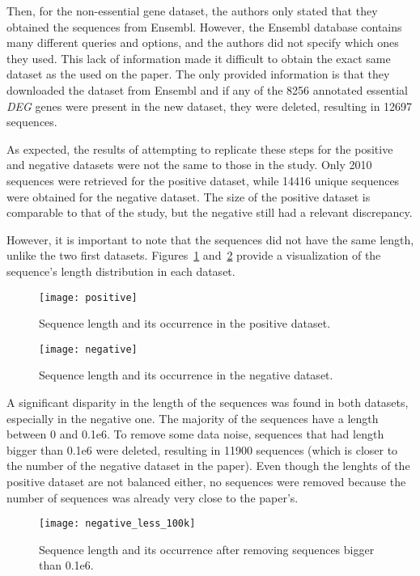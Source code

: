 Then, for the non-essential gene dataset, the authors only stated that they obtained the sequences from Ensembl. However, the Ensembl database contains many different queries and options, and the authors did not specify which ones they used. This lack of information made it difficult to obtain the exact same dataset as the used on the paper. The only provided information is that they downloaded the dataset from Ensembl and if any of the 8256 annotated essential \textit{DEG} genes were present in the new dataset, they were deleted, resulting in 12697 sequences.

As expected, the results of attempting to replicate these steps for the positive and negative datasets were not the same to those in the study. Only 2010 sequences were retrieved for the positive dataset, while 14416 unique sequences were obtained for the negative dataset. The size of the positive dataset is comparable to that of the study, but the negative still had a relevant discrepancy. 

However, it is important to note that the sequences did not have the same length, unlike the two first datasets. Figures~\ref{fig:deg_length} and~\ref{fig:negative}  provide a visualization of the sequence's length distribution in each dataset.

\begin{figure}[htbp]
    \centering
    \texttt{[image: positive]}
    \caption{Sequence length and its occurrence in the positive dataset.}
    \label{fig:deg_length}
\end{figure}

\begin{figure}[htbp]
    \centering
    \texttt{[image: negative]}
    \caption{Sequence length and its occurrence in the negative dataset.}
    \label{fig:negative}
\end{figure}

A significant disparity in the length of the sequences was found in both datasets, especially in the negative one. The majority of the sequences have a length between 0 and 0.1e6. To remove some data noise, sequences that had length bigger than 0.1e6 were deleted, resulting in 11900 sequences (which is closer to the number of the negative dataset in the paper). Even though the lenghts of the positive dataset are not balanced either, no sequences were removed because the number of sequences was already very close to the paper's.

\begin{figure}[htbp]
    \centering
    \texttt{[image: negative\_less\_100k]}
    \caption{Sequence length and its occurrence after removing sequences bigger than 0.1e6.}
    \label{fig:negative_less_100k}
\end{figure}

